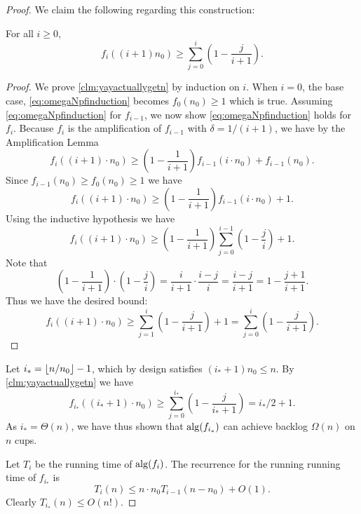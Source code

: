 \begin{proof}
  We claim the following regarding this construction:
  \begin{clm}
    \label{clm:yayactuallygetn}
  For all $i\ge 0$,
  \begin{equation}
    \label{eq:omegaNpfinduction}
    f_i((i+1)n_0) \ge \sum_{j=0}^i \left(1-\frac{j}{i+1}\right).
  \end{equation}
  \end{clm}
  \begin{proof}
  We prove \cref{clm:yayactuallygetn} by induction on $i$. When
  $i=0$, the base case, \eqref{eq:omegaNpfinduction} becomes
  $f_{0}(n_0) \ge 1$ which is true. Assuming
  \eqref{eq:omegaNpfinduction} for $f_{i-1}$, we now show
  \eqref{eq:omegaNpfinduction} holds for $f_{i}$.
  Because $f_{i}$ is the amplification of $f_{i-1}$ with $\delta = 1/(i+1)$, we have by the Amplification Lemma
  $$f_{i}((i+1)\cdot n_0) \ge \left(1 - \frac{1}{i+1}\right) f_{i-1}(i\cdot n_0) + f_{i-1}(n_0).$$
  Since $f_{i-1}(n_0) \ge f_0(n_0) \ge 1$ we have
  $$f_{i}((i+1)\cdot n_0) \ge \left(1 - \frac{1}{i+1}\right) f_{i-1}(i\cdot n_0) + 1.$$
  Using the inductive hypothesis we have
  $$f_{i}((i+1)\cdot n_0) \ge \left(1 - \frac{1}{i+1}\right)\sum_{j=0}^{i-1} \left(1-\frac{j}{i}\right) + 1.$$
  Note that 
  $$\left(1 - \frac{1}{i+1}\right)\cdot
  \left(1-\frac{j}{i}\right) = \frac{i}{i+1} \cdot \frac{i-j}{i}
  = \frac{i-j}{i+1} = 1 - \frac{j+1}{i+1}.$$
  Thus we have the desired bound:
  $$f_{i}((i+1)\cdot n_0) \ge \sum_{j=1}^{i}
  \left(1-\frac{j}{i+1}\right) + 1 = \sum_{j=0}^{i}
  \left(1-\frac{j}{i+1}\right).$$
  \end{proof}

  Let $i_* = \left\lfloor n/n_0 \right\rfloor-1$, which by design satisfies
  $(i_*+1)n_0 \le n$. By \cref{clm:yayactuallygetn} we have
  $$f_{i_*}((i_*+1)\cdot n_0) \ge \sum_{j=0}^{i_*} \left(1 -
  \frac{j}{i_*+1} \right) = i_*/2 + 1.$$ As $i_* = \Theta(n)$, we
  have thus shown that $\operatorname{\text{\textup{alg}}}(f_{i_*})$ can achieve backlog
  $\Omega(n)$ on $n$ cups.

  Let $T_i$ be the running time of $\operatorname{\text{\textup{alg}}}(f_i)$.
  The recurrence for the running running time of $f_{i_*}$ is 
  $$T_i(n) \le n \cdot n_0T_{i-1}(n-n_0)+O(1).$$
  Clearly $T_{i_*}(n) \le O(n!)$.

\end{proof}

